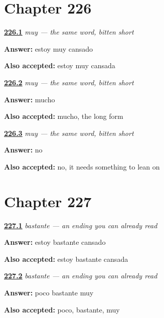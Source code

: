 \section*{Chapter 226}

\noindent\begin{minipage}[t]{\linewidth}
\raggedright
\hyperlink{review-ES-C60-muy-say}{\textbf{226.1}} \emph{muy — the same word, bitten short}\par
\small \textbf{Answer:} estoy muy cansado\par
\footnotesize \textbf{Also accepted:} estoy muy cansada
\end{minipage}\par\medskip

\noindent\begin{minipage}[t]{\linewidth}
\raggedright
\hyperlink{review-ES-C60-muy-which}{\textbf{226.2}} \emph{muy — the same word, bitten short}\par
\small \textbf{Answer:} mucho\par
\footnotesize \textbf{Also accepted:} mucho, the long form
\end{minipage}\par\medskip

\noindent\begin{minipage}[t]{\linewidth}
\raggedright
\hyperlink{review-ES-C60-muy-alone}{\textbf{226.3}} \emph{muy — the same word, bitten short}\par
\small \textbf{Answer:} no\par
\footnotesize \textbf{Also accepted:} no, it needs something to lean on
\end{minipage}\par\medskip

\section*{Chapter 227}

\noindent\begin{minipage}[t]{\linewidth}
\raggedright
\hyperlink{review-ES-C60-bastante-say}{\textbf{227.1}} \emph{bastante — an ending you can already read}\par
\small \textbf{Answer:} estoy bastante cansado\par
\footnotesize \textbf{Also accepted:} estoy bastante cansada
\end{minipage}\par\medskip

\noindent\begin{minipage}[t]{\linewidth}
\raggedright
\hyperlink{review-ES-C60-bastante-scale}{\textbf{227.2}} \emph{bastante — an ending you can already read}\par
\small \textbf{Answer:} poco bastante muy\par
\footnotesize \textbf{Also accepted:} poco, bastante, muy
\end{minipage}\par\medskip

